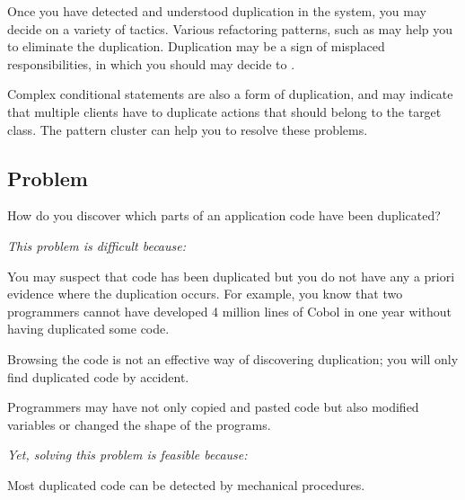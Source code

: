 \documentclass[a4paper,10pt,twoside]{book}
\begin{document}
Once you have detected and understood duplication in the system, you may decide on a variety of tactics. Various refactoring patterns, such as  may help you to eliminate the duplication. Duplication may be a sign of misplaced responsibilities, in which you should may decide to . 

Complex conditional statements are also a form of duplication, and may indicate that multiple clients have to duplicate actions that should belong to the target class. The pattern cluster  can help you to resolve these problems.




\subsection*{Problem}

How do you discover which parts of an application code have been duplicated?

\emph{This problem is difficult because:} 

\begin{bulletlist}
\item You may suspect that code has been duplicated but you do not have any a priori evidence where the duplication occurs. For example, you know that two programmers cannot have developed 4 million lines of Cobol in one year without having duplicated some code.

\item Browsing the code is not an effective way of discovering duplication; you will only find duplicated code by accident.

\item Programmers may have not only copied and pasted code but also modified variables or changed the shape of the programs.
\end{bulletlist}

\emph{Yet, solving this problem is feasible because:}

\begin{bulletlist}
\item Most duplicated code can be detected by mechanical procedures.
\end{bulletlist}
\end{document}
